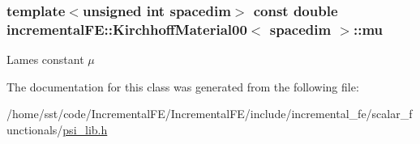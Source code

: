 \subsubsection[{\texorpdfstring{mu}{mu}}]{\setlength{\rightskip}{0pt plus 5cm}template$<$unsigned int spacedim$>$ const double {\bf incremental\+F\+E\+::\+Kirchhoff\+Material00}$<$ spacedim $>$\+::mu\hspace{0.3cm}{\ttfamily [private]}}\hypertarget{classincremental_f_e_1_1_kirchhoff_material00_a27770f7ae063508ca40aa009925c4a0b}{}\label{classincremental_f_e_1_1_kirchhoff_material00_a27770f7ae063508ca40aa009925c4a0b}
Lame\textquotesingle{}s constant $\mu$ 

The documentation for this class was generated from the following file\+:\begin{DoxyCompactItemize}
\item 
/home/sst/code/\+Incremental\+F\+E/\+Incremental\+F\+E/include/incremental\+\_\+fe/scalar\+\_\+functionals/\hyperlink{psi__lib_8h}{psi\+\_\+lib.\+h}\end{DoxyCompactItemize}
